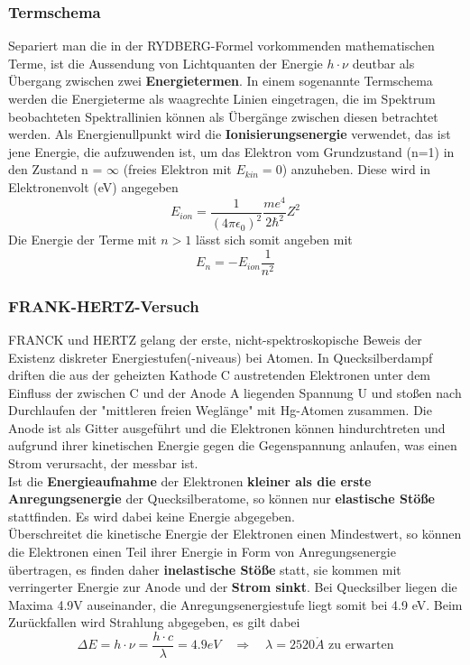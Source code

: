\documentclass[12pt,a4paper,ngerman]{article}
\begin{document}
\subsubsection*{Termschema}
Separiert man die in der RYDBERG-Formel vorkommenden mathematischen Terme, ist die Aussendung von Lichtquanten der Energie $h \cdot \nu$ deutbar als Übergang zwischen zwei \textbf{Energietermen}. In einem sogenannte Termschema werden die Energieterme als waagrechte Linien eingetragen, die im Spektrum beobachteten Spektrallinien können als Übergänge zwischen diesen betrachtet werden. Als Energienullpunkt wird die \textbf{Ionisierungsenergie} verwendet, das ist jene Energie, die aufzuwenden ist, um das Elektron vom Grundzustand (n=1) in den Zustand n = $\infty$ (freies Elektron mit $E_{kin} = 0$) anzuheben. Diese wird in Elektronenvolt (eV) angegeben
\begin{equation}
E_{ion} = \frac{1}{(4 \pi \epsilon_0)^2}\frac{me^4}{2\hbar^2}Z^2
\end{equation}
Die Energie der Terme mit $n > 1$ lässt sich somit angeben mit
\begin{equation}
E_n = -E_{ion}\frac{1}{n^2}
\end{equation}

\pagebreak


\subsubsection*{FRANK-HERTZ-Versuch}
FRANCK und HERTZ gelang der erste, nicht-spektroskopische Beweis der Existenz diskreter Energiestufen(-niveaus) bei Atomen. In Quecksilberdampf driften die aus der geheizten Kathode C austretenden Elektronen unter dem Einfluss der zwischen C und der Anode A liegenden Spannung U und stoßen nach Durchlaufen der "mittleren freien Weglänge" mit Hg-Atomen zusammen. Die Anode ist als Gitter ausgeführt und die Elektronen können hindurchtreten und aufgrund ihrer kinetischen Energie gegen die Gegenspannung anlaufen, was einen Strom verursacht, der messbar ist. \\
Ist die \textbf{Energieaufnahme} der Elektronen \textbf{kleiner als die erste Anregungsenergie} der Quecksilberatome, so können nur \textbf{elastische Stöße} stattfinden. Es wird dabei keine Energie abgegeben. \\
Überschreitet die kinetische Energie der Elektronen einen Mindestwert, so können die Elektronen einen Teil ihrer Energie in Form von Anregungsenergie übertragen, es finden daher \textbf{inelastische Stöße} statt, sie kommen mit verringerter Energie zur Anode und der \textbf{Strom sinkt}. Bei Quecksilber liegen die Maxima 4.9V auseinander, die Anregungsenergiestufe liegt somit bei 4.9 eV. Beim Zurückfallen wird Strahlung abgegeben, es gilt dabei
\begin{equation}
\Delta E = h \cdot \nu = \frac{h \cdot c}{\lambda} = 4.9 eV \quad \Rightarrow \quad \lambda=2520 \mathring{A} \text{ zu erwarten}
\end{equation}
\end{document}
